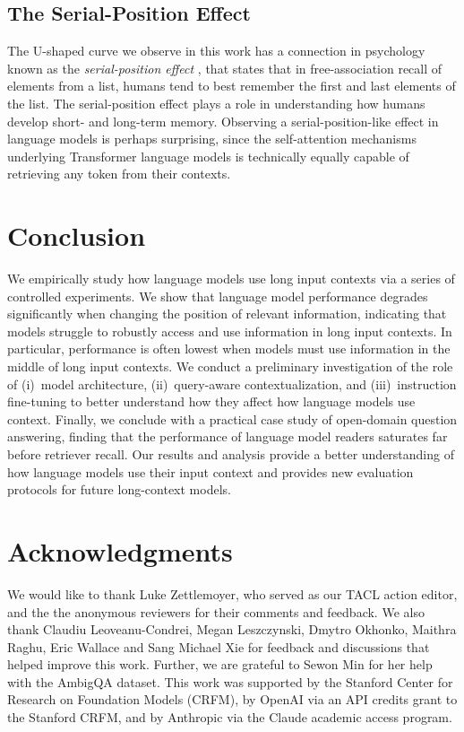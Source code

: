\documentclass[11pt,a4paper]{article}
\begin{document}
\subsection{The Serial-Position Effect}
The U-shaped curve we observe in this work has a connection in psychology known as the \textit{serial-position effect} \cite{ebbinghaus1913memory,murdock1962serial}, that states that in free-association recall of elements from a list, humans tend to best remember the first and last elements of the list.
The serial-position effect plays a role in understanding how humans develop short- and long-term memory.
Observing a serial-position-like effect in language models is perhaps surprising, since the self-attention mechanisms underlying Transformer language models is technically equally capable of retrieving any token from their contexts.

\section{Conclusion}

We empirically study how language models use long input contexts via a series of controlled experiments.
We show that language model performance degrades significantly when changing the position of relevant information, indicating that models struggle to robustly access and use information in long input contexts.
In particular, performance is often lowest when models must use information in the middle of long input contexts.
We conduct a preliminary investigation of the role of (i)~model architecture, (ii)~query-aware contextualization, and (iii)~instruction fine-tuning to better understand how they affect how language models use context.
Finally, we conclude with a practical case study of open-domain question answering, finding that the performance of language model readers saturates far before retriever recall.
Our results and analysis provide a better understanding of how language models use their input context and provides new evaluation protocols for future long-context models.

\section*{Acknowledgments}

We would like to thank Luke Zettlemoyer, who served as our TACL action editor, and the the anonymous reviewers for their comments and feedback.
We also thank Claudiu Leoveanu-Condrei, Megan Leszczynski, Dmytro Okhonko, Maithra Raghu, Eric Wallace and Sang Michael Xie for feedback and discussions that helped improve this work.
Further, we are grateful to Sewon Min for her help with the AmbigQA dataset.
This work was supported by the Stanford Center for Research on Foundation Models (CRFM), by OpenAI via an API credits grant to the Stanford CRFM, and by Anthropic via the Claude academic access program.
\end{document}
